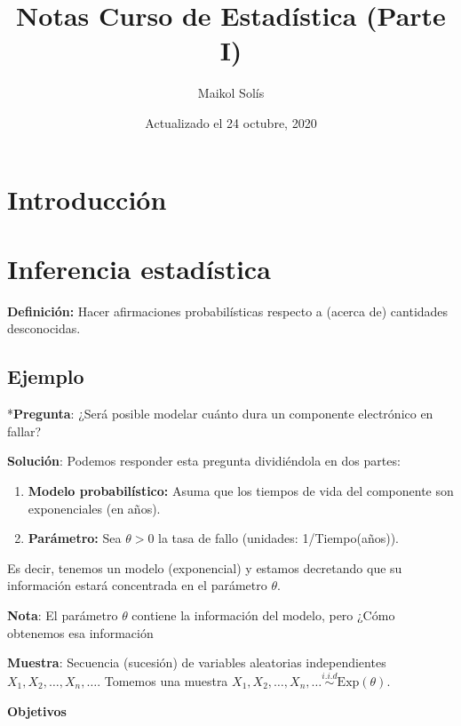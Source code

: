 \documentclass[
  12pt,
]{book}
\title{Notas Curso de Estadística (Parte I)}
\author{Maikol Solís}
\date{Actualizado el 24 octubre, 2020}
\providecommand{\tightlist}{%
  \setlength{\itemsep}{0pt}\setlength{\parskip}{0pt}}
\begin{document}
\maketitle

{
\hypersetup{linkcolor=}
\setcounter{tocdepth}{4}
\tableofcontents
}
\hypertarget{introducciuxf3n}{%
\chapter{Introducción}\label{introducciuxf3n}}

\hypertarget{inferencia-estaduxedstica}{%
\chapter{Inferencia estadística}\label{inferencia-estaduxedstica}}

\textbf{Definición:} Hacer afirmaciones probabilísticas respecto a (acerca de)
cantidades desconocidas.

\hypertarget{ejemplo}{%
\section{Ejemplo}\label{ejemplo}}

*\textbf{Pregunta}: ¿Será posible modelar cuánto dura un componente electrónico en
fallar?

\textbf{Solución}: Podemos responder esta pregunta dividiéndola en dos partes:

\begin{enumerate}
\def\labelenumi{\arabic{enumi}.}
\tightlist
\item
  \textbf{Modelo probabilístico:} Asuma que los tiempos de vida del componente son
  exponenciales (en años).
\item
  \textbf{Parámetro:} Sea \(\theta > 0\) la tasa de fallo (unidades: 1/Tiempo(años)).
\end{enumerate}

Es decir, tenemos un modelo (exponencial) y estamos decretando que su información estará concentrada en el parámetro \(\theta\).

\textbf{Nota}: El parámetro \(\theta\) contiene la información del modelo,
pero ¿Cómo obtenemos esa información

\textbf{Muestra}: Secuencia (sucesión) de variables aleatorias independientes \(X_1,X_2,\dots, X_n,\dots\). Tomemos una muestra \(X_1,X_2,\dots, X_n,\dots \stackrel{i.i.d}{\sim} \text{Exp}(\theta)\).

\textbf{Objetivos}
\end{document}
